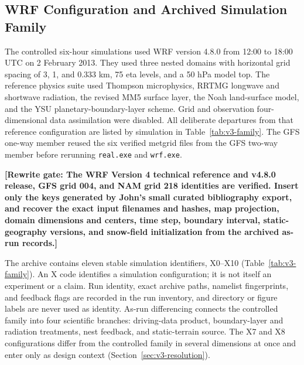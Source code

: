 \documentclass[air,article,submit,moreauthors]{Definitions/mdpi}
\newcommand{\rewritegate}[1]{\textbf{[Rewrite gate: #1]}}
\begin{document}
\subsection{WRF Configuration and Archived Simulation Family}
\label{sec:v3-family}

The controlled six-hour simulations used WRF version 4.8.0 from 12:00 to 18:00 UTC on 2 February 2013.
They used three nested domains with horizontal grid spacing of 3, 1, and 0.333 km, 75 eta levels, and a 50 hPa model top.
The reference physics suite used Thompson microphysics, RRTMG longwave and shortwave radiation, the revised MM5 surface layer, the Noah land-surface model, and the YSU planetary-boundary-layer scheme.
Grid and observation four-dimensional data assimilation were disabled.
All deliberate departures from that reference configuration are listed by simulation in Table~\ref{tab:v3-family}.
The GFS one-way member reused the six verified metgrid files from the GFS two-way member before rerunning \texttt{real.exe} and \texttt{wrf.exe}.

\rewritegate{The WRF Version 4 technical reference and v4.8.0 release, GFS grid 004, and NAM grid 218 identities are verified.
Insert only the keys generated by John's small curated bibliography export, and recover the exact input filenames and hashes, map projection, domain dimensions and centers, time step, boundary interval, static-geography versions, and snow-field initialization from the archived as-run records.}

The archive contains eleven stable simulation identifiers, X0--X10 (Table~\ref{tab:v3-family}).
An X code identifies a simulation configuration; it is not itself an experiment or a claim.
Run identity, exact archive paths, namelist fingerprints, and feedback flags are recorded in the run inventory, and directory or figure labels are never used as identity.
As-run differencing connects the controlled family into four scientific branches: driving-data product, boundary-layer and radiation treatments, nest feedback, and static-terrain source.
The X7 and X8 configurations differ from the controlled family in several dimensions at once and enter only as design context (Section~\ref{sec:v3-resolution}).
\end{document}
